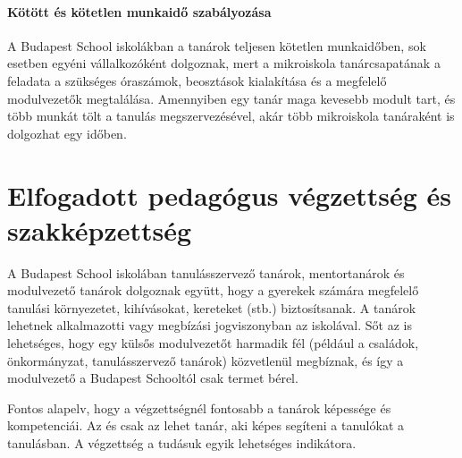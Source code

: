 \paragraph{Kötött és kötetlen munkaidő szabályozása}

A Budapest School  iskolákban a tanárok teljesen kötetlen munkaidőben, sok esetben egyéni vállalkozóként dolgoznak, mert a mikroiskola tanárcsapatának a feladata a szükséges óraszámok, beosztások kialakítása és a megfelelő modulvezetők megtalálása. Amennyiben egy tanár maga kevesebb modult tart, és több munkát tölt a tanulás megszervezésével, akár több mikroiskola tanáraként is dolgozhat egy időben.

\section{Elfogadott pedagógus végzettség és szakképzettség}

A Budapest School iskolában tanulásszervező tanárok, mentortanárok és modulvezető tanárok dolgoznak együtt, hogy a gyerekek számára megfelelő tanulási környezetet, kihívásokat, kereteket (stb.) biztosítsanak. A tanárok lehetnek alkalmazotti vagy megbízási jogviszonyban az iskolával. Sőt az is lehetséges, hogy egy külsős modulvezetőt harmadik fél (például a családok, önkormányzat, tanulásszervező tanárok) közvetlenül megbíznak, és így a modulvezető a Budapest Schooltól csak termet bérel.

Fontos alapelv, hogy a végzettségnél fontosabb a tanárok képessége és kompetenciái. Az és csak az lehet tanár, aki képes segíteni a tanulókat a tanulásban. A végzettség a tudásuk egyik lehetséges indikátora.

